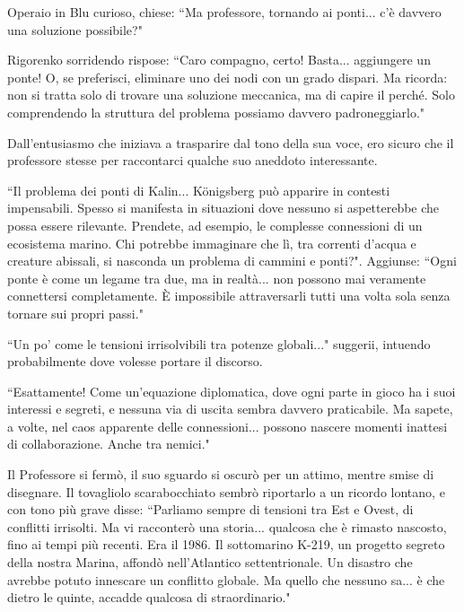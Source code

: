 \documentclass[12pt,b5paper]{article}
\begin{document}

Operaio in Blu curioso, chiese: ``Ma professore, tornando ai ponti... c'è davvero
una soluzione possibile?"

Rigorenko sorridendo rispose: ``Caro compagno, certo! Basta... aggiungere un
ponte! O, se preferisci, eliminare uno dei nodi con un grado dispari. Ma
ricorda: non si tratta solo di trovare una soluzione meccanica, ma di capire
il perché. Solo comprendendo la struttura del problema possiamo davvero
padroneggiarlo."

Dall'entusiasmo che iniziava a trasparire dal tono della sua voce, ero sicuro
che il professore stesse per raccontarci qualche suo aneddoto interessante.

``Il problema dei ponti di Kalin... Königsberg può apparire in contesti
impensabili. Spesso si manifesta in situazioni dove nessuno si aspetterebbe che
possa essere rilevante. Prendete, ad esempio, le complesse connessioni di un ecosistema marino. Chi potrebbe immaginare che lì, tra correnti d'acqua e creature
abissali, si nasconda un problema di cammini e ponti?". Aggiunse: ``Ogni ponte
è come un legame tra due, ma in realtà... non possono mai veramente connettersi
completamente. È impossibile attraversarli tutti una volta sola senza tornare
sui propri passi." 

``Un po' come le tensioni irrisolvibili tra potenze globali..." suggerii, intuendo
probabilmente dove volesse portare il discorso.

``Esattamente! Come un'equazione diplomatica, dove ogni parte in gioco ha i suoi
interessi e segreti, e nessuna via di uscita sembra davvero praticabile. Ma
sapete, a volte, nel caos apparente delle connessioni... possono nascere momenti
inattesi di collaborazione. Anche tra nemici."

Il Professore si fermò, il suo sguardo si oscurò per un attimo, mentre smise
di disegnare. Il tovagliolo scarabocchiato sembrò riportarlo a un ricordo
lontano, e con tono più grave disse: ``Parliamo sempre di tensioni tra Est e
Ovest, di conflitti irrisolti. Ma vi racconterò una storia... qualcosa che è
rimasto nascosto, fino ai tempi più recenti. Era il 1986. Il sottomarino K-219,
un progetto segreto della nostra Marina, affondò nell'Atlantico settentrionale.
Un disastro che avrebbe potuto innescare un conflitto globale. Ma quello che
nessuno sa... è che dietro le quinte, accadde qualcosa di straordinario."
\end{document}
